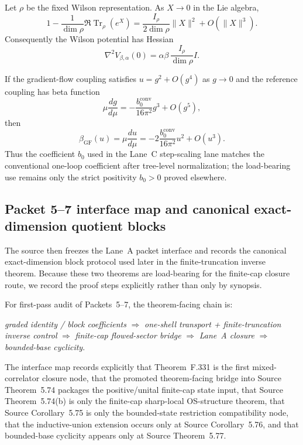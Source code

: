 \begin{lemma}
Let $\rho$ be the fixed Wilson representation. As $X\to 0$ in the Lie algebra,
\[
1-\frac{1}{\dim\rho}\Re\operatorname{Tr}_\rho(e^X)
=
\frac{I_\rho}{2\dim\rho}\|X\|^2 + O(\|X\|^3).
\]
Consequently the Wilson potential has Hessian
\[
\nabla^2 V_{\beta,\alpha}(0)=\alpha\beta\,\frac{I_\rho}{\dim\rho}I.
\]
\end{lemma}

\begin{lemma}
If the gradient-flow coupling satisfies $u=g^2+O(g^4)$ as $g\to 0$ and the reference coupling has beta function
\[
\mu\frac{dg}{d\mu} = -\frac{b_0^{\mathrm{conv}}}{16\pi^2}g^3 + O(g^5),
\]
then
\[
\beta_{\mathrm{GF}}(u)=\mu\frac{du}{d\mu} = -2\frac{b_0^{\mathrm{conv}}}{16\pi^2}u^2 + O(u^3).
\]
Thus the coefficient $b_0$ used in the Lane~C step-scaling lane matches the conventional one-loop coefficient after tree-level normalization; the load-bearing use remains only the strict positivity $b_0>0$ proved elsewhere.
\end{lemma}

\subsection{Packet 5--7 interface map and canonical exact-dimension quotient blocks}
The source then freezes the Lane~A packet interface and records the canonical exact-dimension block protocol used later in the finite-truncation inverse theorem. Because these two theorems are load-bearing for the finite-cap closure route, we record the proof steps explicitly rather than only by synopsis.

\begin{remark}
For first-pass audit of Packets~5--7, the theorem-facing chain is:
\begin{center}
\emph{graded identity / block coefficients}
$\Longrightarrow$
\emph{one-shell transport + finite-truncation inverse control}
$\Longrightarrow$
\emph{finite-cap flowed-sector bridge}
$\Longrightarrow$
\emph{Lane~A closure}
$\Longrightarrow$
\emph{bounded-base cyclicity}.
\end{center}
The interface map records explicitly that Theorem~F.331 is the first mixed-correlator closure node, that the promoted theorem-facing bridge into Source Theorem~5.74 packages the positive/unital finite-cap state input, that Source Theorem~5.74(b) is only the finite-cap sharp-local OS-structure theorem, that Source Corollary~5.75 is only the bounded-state restriction compatibility node, that the inductive-union extension occurs only at Source Corollary~5.76, and that bounded-base cyclicity appears only at Source Theorem~5.77.
\end{remark}

